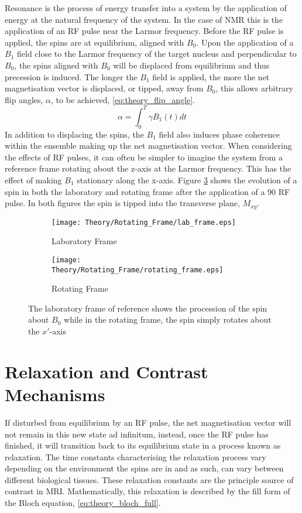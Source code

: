 Resonance is the process of energy transfer into a system by the application of energy at the natural frequency of the system. In the case of \ac{NMR} this is the application of an \ac{RF} pulse near the Larmor frequency. Before the \ac{RF} pulse is applied, the spins are at equilibrium, aligned with $B_0$. Upon the application of a $B_1$ field close to the Larmor frequency of the target nucleus and perpendicular to $B_0$, the spins aligned with $B_0$ will be displaced from equilibrium and thus precession is induced. The longer the $B_1$ field is applied, the more the net magnetisation vector is displaced, or tipped, away from $B_0$, this allows arbitrary flip angles, $\alpha$, to be achieved, \eqref{eq:theory_flip_angle}. 
\begin{equation}
\alpha = \int_{0}^{T} \gamma B_1\left(t\right) dt
\label{eq:theory_flip_angle}
\end{equation}
In addition to displacing the spins, the $B_1$ field also induces phase coherence within the ensemble making up the net magnetisation vector. When considering the effects of \ac{RF} pulses, it can often be simpler to imagine the system from a reference frame rotating about the z-axis at the Larmor frequency. This has the effect of making $B_1$ stationary along the x-axis. Figure \ref{fig:theory_reference_frames} shows the evolution of a spin in both the laboratory and rotating frame after the application of a 90\degree{ }  \ac{RF} pulse. In both figures the spin is tipped into the transverse plane, $M_{xy}$.

\begin{figure}[H]
	\centering
	\begin{subfigure}[c]{0.47\textwidth}
		\centering
		\texttt{[image: Theory/Rotating\_Frame/lab\_frame.eps]}
		\caption{Laboratory Frame}
		\label{fig:thoery_lab_frame}
	\end{subfigure}
	\hfill
	\begin{subfigure}[c]{0.47\textwidth}
		\centering
		\texttt{[image: Theory/Rotating\_Frame/rotating\_frame.eps]}
		\caption{Rotating Frame}
		\label{fig:theory_rotating_frame}
	\end{subfigure}
	\caption{The laboratory frame of reference shows the procession of the spin about $B_0$ while in the rotating frame, the spin simply rotates about the $x'$-axis}
	\label{fig:theory_reference_frames}
\end{figure}

\newpage
\section{Relaxation and Contrast Mechanisms}
If disturbed from equilibrium by an \ac{RF} pulse, the net magnetisation vector will not remain in this new state ad infinitum, instead, once the \ac{RF} pulse has finished, it will transition back to its equilibrium state in a process known as relaxation. The time constants characterising the relaxation process vary depending on the environment the spins are in and as such, can vary between different biological tissues. These relaxation constants are the principle source of contrast in \ac{MRI}. Mathematically, this relaxation is described by the fill form of the Bloch equation, \eqref{eq:theory_bloch_full}.

